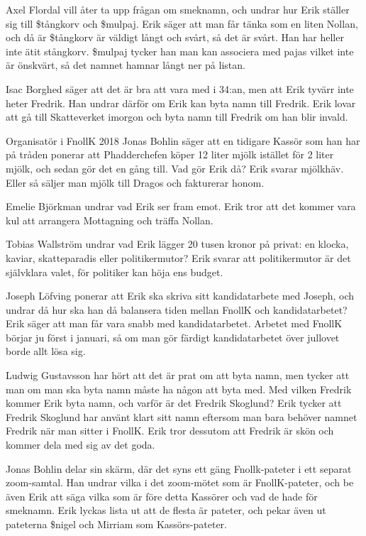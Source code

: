 \documentclass[hidelinks]{sektionsmote} %
\begin{document}
Axel Flordal vill åter ta upp frågan om smeknamn, och undrar hur Erik ställer sig till \$tångkorv och \$mulpaj.
Erik säger att man får tänka som en liten Nollan, och då är \$tångkorv är väldigt långt och svårt, så det är svårt.
Han har heller inte ätit stångkorv.
\$mulpaj tycker han man kan associera med pajas vilket inte är önskvärt, så det namnet hamnar långt ner på listan.\par
Isac Borghed säger att det är bra att vara med i 34:an, men att Erik tyvärr inte heter Fredrik.
Han undrar därför om Erik kan byta namn till Fredrik.
Erik lovar att gå till Skatteverket imorgon och byta namn till Fredrik om han blir invald.\par
Organisatör i FnollK 2018 Jonas Bohlin säger att en tidigare Kassör som han har på tråden ponerar att Phadderchefen köper 12 liter mjölk istället för 2 liter mjölk, och sedan gör det en gång till.
Vad gör Erik då?
Erik svarar mjölkhäv.
Eller så säljer man mjölk till Dragos och fakturerar honom.\par
Emelie Björkman undrar vad Erik ser fram emot.
Erik tror att det kommer vara kul att arrangera Mottagning och träffa Nollan.\par
Tobias Wallström undrar vad Erik lägger 20 tusen kronor på privat: en klocka, kaviar, skatteparadis eller politikermutor?
Erik svarar att politikermutor är det självklara valet, för politiker kan höja ens budget.\par
Joseph Löfving ponerar att Erik ska skriva sitt kandidatarbete med Joseph, och undrar då hur ska han då balansera tiden mellan FnollK och kandidatarbetet?
Erik säger att man får vara snabb med kandidatarbetet.
Arbetet med FnollK börjar ju först i januari, så om man gör färdigt kandidatarbetet över jullovet borde allt lösa sig.\par
Ludwig Gustavsson har hört att det är prat om att byta namn, men tycker att man om man ska byta namn måste ha någon att byta med.
Med vilken Fredrik kommer Erik byta namn, och varför är det Fredrik Skoglund?
Erik tycker att Fredrik Skoglund har använt klart sitt namn eftersom man bara behöver namnet Fredrik när man sitter i FnollK.
Erik tror dessutom att Fredrik är skön och kommer dela med sig av det goda.\par
Jonas Bohlin delar sin skärm, där det syns ett gäng Fnollk-pateter i ett separat zoom-samtal.
Han undrar vilka i det zoom-mötet som är FnollK-pateter, och be även Erik att säga vilka som är före detta Kassörer och vad de hade för smeknamn.
Erik lyckas lista ut att de flesta är pateter, och pekar även ut pateterna \$nigel och Mirriam som Kassörs-pateter.
\end{document}
